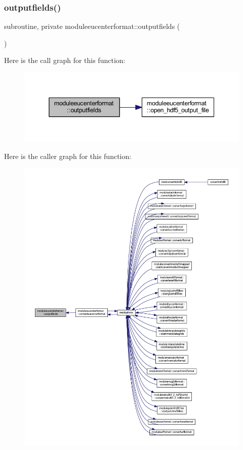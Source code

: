 \subsubsection{\texorpdfstring{outputfields()}{outputfields()}}
{\footnotesize\ttfamily subroutine, private moduleeucenterformat\+::outputfields (\begin{DoxyParamCaption}{ }\end{DoxyParamCaption})\hspace{0.3cm}{\ttfamily [private]}}

Here is the call graph for this function\+:\nopagebreak
\begin{figure}[H]
\begin{center}
\leavevmode
\includegraphics[width=345pt]{namespacemoduleeucenterformat_afb336c51f13a7459800b82f45a13e498_cgraph}
\end{center}
\end{figure}
Here is the caller graph for this function\+:\nopagebreak
\begin{figure}[H]
\begin{center}
\leavevmode
\includegraphics[width=350pt]{namespacemoduleeucenterformat_afb336c51f13a7459800b82f45a13e498_icgraph}
\end{center}
\end{figure}
